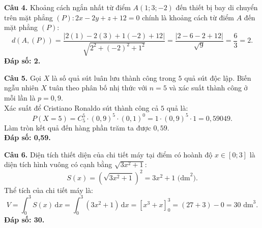 \documentclass[12pt,a4paper]{article}
\begin{document}
\vspace{0.3cm}
\noindent\textbf{Câu 4.} Khoảng cách ngắn nhất từ điểm $A(1; 3; -2)$ đến thiết bị bay di chuyển trên mặt phẳng $(P): 2x - 2y + z + 12 = 0$ chính là khoảng cách từ điểm $A$ đến mặt phẳng $(P)$:
\[
d(A, (P)) = \dfrac{|2(1) - 2(3) + 1(-2) + 12|}{\sqrt{2^2 + (-2)^2 + 1^2}} = \dfrac{|2 - 6 - 2 + 12|}{\sqrt{9}} = \dfrac{6}{3} = 2.
\]
\textbf{Đáp số: 2.}

\vspace{0.3cm}
\noindent\textbf{Câu 5.} Gọi $X$ là số quả sút luân lưu thành công trong $5$ quả sút độc lập. Biến ngẫu nhiên $X$ tuân theo phân bố nhị thức với $n = 5$ và xác suất thành công ở mỗi lần là $p = 0{,}9$.\\
Xác suất để Cristiano Ronaldo sút thành công cả $5$ quả là:
\[
P(X = 5) = C_5^5 \cdot (0{,}9)^5 \cdot (0{,}1)^0 = 1 \cdot (0{,}9)^5 \cdot 1 = 0{,}59049.
\]
Làm tròn kết quả đến hàng phần trăm ta được $0{,}59$.\\
\textbf{Đáp số: 0,59.}

\vspace{0.3cm}
\noindent\textbf{Câu 6.} Diện tích thiết diện của chi tiết máy tại điểm có hoành độ $x \in [0; 3]$ là diện tích hình vuông có cạnh bằng $\sqrt{3x^2 + 1}$:
\[
S(x) = \left(\sqrt{3x^2 + 1}\right)^2 = 3x^2 + 1\text{ (dm}^2\text{)}.
\]
Thể tích của chi tiết máy là:
\[
V = \int_0^3 S(x)\,\text{d}x = \int_0^3 (3x^2 + 1)\,\text{d}x = \left[ x^3 + x \right]_0^3 = (27 + 3) - 0 = 30\text{ dm}^3.
\]
\textbf{Đáp số: 30.}
\end{document}
